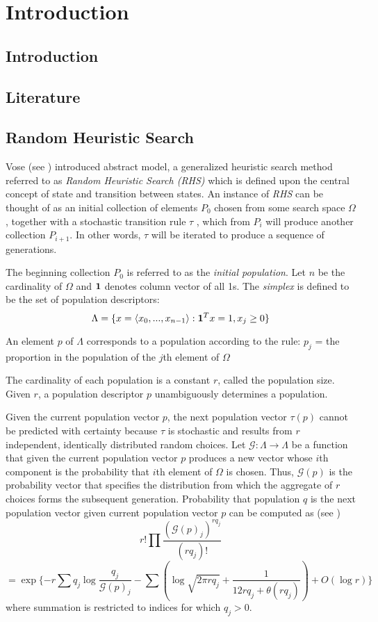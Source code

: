 \chapter{Introduction} \label{ch:introduction}

\section{Introduction}
\section{Literature}
\section{Random Heuristic Search}
Vose (see \cite{Vose1999}) introduced abstract model, a generalized heuristic search method referred to as {\em Random Heuristic Search (RHS)} which is defined upon the central concept of state and transition between states. An instance of {\em RHS} can be thought of as an initial collection of elements $P_0$ chosen from some search space $\Omega$ , together with a stochastic transition rule $\tau$ , which from $P_i$ will produce another collection $P_{i+1}$. In other words, $\tau$ will be iterated to produce a sequence of generations.

The beginning collection $P_0$ is referred to as the {\em initial population}. Let $n$ be the cardinality of $\Omega$ and ${\bf1}$ denotes column vector of all 1s. The {\em simplex} is defined to be the set of population descriptors:
\[
\Lambda = \{x = \langle x_0,...,x_{n-1} \rangle: {\bf1}^T x=1, x_j \geq 0 \}
\]

An element $p$ of $\Lambda$ corresponds to a population according to the rule:
$p_j$ = the proportion in the population of the $j$th element of $\Omega$

The cardinality of each population is a constant $r$, called the population size. Given $r$, a population descriptor $p$ unambiguously determines a population.

Given the current population vector $p$, the next population vector $\tau(p)$ cannot be predicted with certainty because $\tau$ is stochastic 
and results from $r$ independent, identically distributed random choices. Let $\mathcal{G}:\Lambda \rightarrow \Lambda$ be a function that given the current population vector $p$ produces a new vector whose $i$th component is the probability that $i$th element of $\Omega$ is chosen. Thus, $\mathcal{G}(p)$ is the probability vector that specifies the distribution from which the aggregate of $r$ choices forms the subsequent generation.
Probability that population $q$ is the next population vector given current population vector $p$ can be computed as (see \cite{Vose1999}) 
\[
r! \prod \frac{(\mathcal{G}(p)_j)^{rq_j}}{(rq_j)!}
\]
\[
 = \exp\{-r \sum q_j \log \frac{q_j}{\mathcal{G}(p)_j} - \sum (\log \sqrt{2 \pi rq_j} + \frac{1}{12rq_j + \theta (rq_j)}) + O(\log r)\}
\]
where summation is restricted to indices for which $q_j > 0$.

